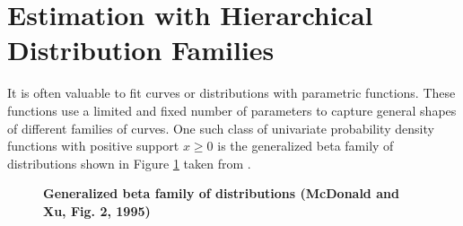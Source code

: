 \documentclass[letterpaper,12pt]{article}
\theoremstyle{definition}
\begin{document}
\section{Estimation with Hierarchical Distribution Families}\label{SecDistFam}

  It is often valuable to fit curves or distributions with parametric functions. These functions use a limited and fixed number of parameters to capture general shapes of different families of curves. One such class of univariate probability density functions with positive support $x\geq 0$ is the generalized beta family of distributions shown in Figure \ref{FigGBtree} taken from \citet[Fig. 2]{McDonaldXu:1995}.

  \begin{figure}[htb]\centering\captionsetup{width=6.0in}
    \caption{\textbf{Generalized beta family of distributions (McDonald and Xu, Fig. 2, 1995)}}\label{FigGBtree}
  \end{figure}
\end{document}
